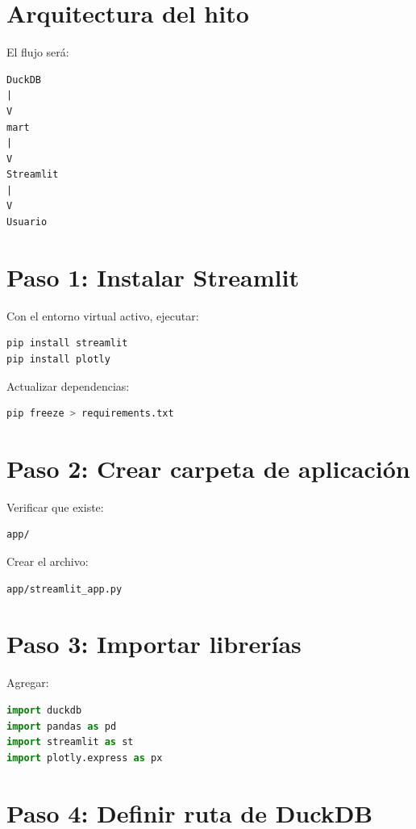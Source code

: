 \section{Arquitectura del hito}

El flujo será:

\begin{verbatim}
DuckDB
|
V
mart
|
V
Streamlit
|
V
Usuario
\end{verbatim}

\section{Paso 1: Instalar Streamlit}

Con el entorno virtual activo, ejecutar:

\begin{lstlisting}[language=bash]
pip install streamlit
pip install plotly
\end{lstlisting}

Actualizar dependencias:

\begin{lstlisting}[language=bash]
pip freeze > requirements.txt
\end{lstlisting}

\section{Paso 2: Crear carpeta de aplicación}

Verificar que existe:

\begin{verbatim}
app/
\end{verbatim}

Crear el archivo:

\begin{verbatim}
app/streamlit_app.py
\end{verbatim}

\section{Paso 3: Importar librerías}

Agregar:

\begin{lstlisting}[language=Python]
import duckdb
import pandas as pd
import streamlit as st
import plotly.express as px
\end{lstlisting}

\section{Paso 4: Definir ruta de DuckDB}

